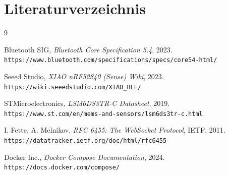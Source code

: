 \documentclass[11pt, a4paper]{article}
\begin{document}
\section*{Literaturverzeichnis}
\vspace{.5cm}
\begin{thebibliography}{9}

Bluetooth SIG, \textit{Bluetooth Core Specification 5.4}, 2023. \\
\texttt{https://www.bluetooth.com/specifications/specs/core54-html/}

Seeed Studio, \textit{XIAO nRF52840 (Sense) Wiki}, 2023. \\
\texttt{https://wiki.seeedstudio.com/XIAO\_BLE/}

STMicroelectronics, \textit{LSM6DS3TR-C Datasheet}, 2019. \\
\texttt{https://www.st.com/en/mems-and-sensors/lsm6ds3tr-c.html}

I. Fette, A. Melnikov, \textit{RFC 6455: The WebSocket Protocol}, IETF, 2011. \\
\texttt{https://datatracker.ietf.org/doc/html/rfc6455}

Docker Inc., \textit{Docker Compose Documentation}, 2024. \\
\texttt{https://docs.docker.com/compose/}

\end{thebibliography}
\end{document}
